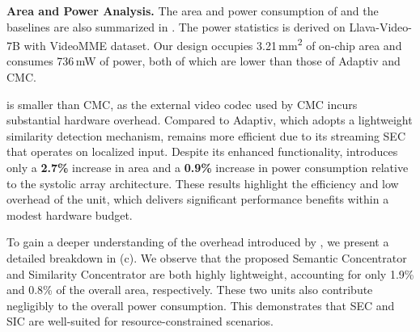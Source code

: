 \begin{table}[t]
    \centering
    \caption{Configuration comparison of \proj and baseline architecture}
    \label{tab:setup_compare}
\end{table}


\textbf{Area and Power Analysis.}
The area and power consumption of \proj and the baselines are also summarized in . The power statistics is derived on Llava-Video-7B with VideoMME dataset. Our \proj design occupies {3.21}\,mm\textsuperscript{2} of on-chip area and consumes {736}\,mW of power, both of which are lower than those of Adaptiv and CMC.

\proj is smaller than CMC, as the external video codec used by CMC incurs substantial hardware overhead. Compared to Adaptiv, which adopts a lightweight similarity detection mechanism, \proj remains more efficient due to its streaming SEC that operates on localized input. Despite its enhanced functionality, \proj introduces only a {\textbf{2.7\%}} increase in area and a {\textbf{0.9\%}} increase in power consumption relative to the systolic array architecture.
These results highlight the efficiency and low overhead of the \proj unit, which delivers significant performance benefits within a modest hardware budget.

To gain a deeper understanding of the overhead introduced by \proj, we present a detailed breakdown in (c). We observe that the proposed Semantic Concentrator and Similarity Concentrator are both highly lightweight, accounting for only 1.9\% and 0.8\% of the overall area, respectively. These two units also contribute negligibly to the overall power consumption. This demonstrates that SEC and SIC are well-suited for resource-constrained scenarios.


